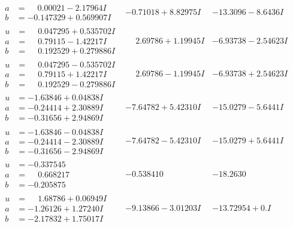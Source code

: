 \documentclass[1p]{elsarticle_modified}
\theoremstyle{definition}
\begin{document}
$$\begin{array}{c|c|c}
\begin{aligned}
a &= \phantom{-}0.00021 - 2.17964 I \\
b &= -0.147329 + 0.569907 I\end{aligned}
 & -0.71018 + 8.82975 I & -13.3096 - 8.6436 I \\ \hline\begin{aligned}
u &= \phantom{-}0.047295 + 0.535702 I \\
a &= \phantom{-}0.79115 - 1.42217 I \\
b &= \phantom{-}0.192529 + 0.279886 I\end{aligned}
 & \phantom{-}2.69786 + 1.19945 I & -6.93738 - 2.54623 I \\ \hline\begin{aligned}
u &= \phantom{-}0.047295 - 0.535702 I \\
a &= \phantom{-}0.79115 + 1.42217 I \\
b &= \phantom{-}0.192529 - 0.279886 I\end{aligned}
 & \phantom{-}2.69786 - 1.19945 I & -6.93738 + 2.54623 I \\ \hline\begin{aligned}
u &= -1.63846 + 0.04838 I \\
a &= -0.24414 + 2.30889 I \\
b &= -0.31656 + 2.94869 I\end{aligned}
 & -7.64782 + 5.42310 I & -15.0279 - 5.6441 I \\ \hline\begin{aligned}
u &= -1.63846 - 0.04838 I \\
a &= -0.24414 - 2.30889 I \\
b &= -0.31656 - 2.94869 I\end{aligned}
 & -7.64782 - 5.42310 I & -15.0279 + 5.6441 I \\ \hline\begin{aligned}
u &= -0.337545\phantom{ +0.000000I} \\
a &= \phantom{-}0.668217\phantom{ +0.000000I} \\
b &= -0.205875\phantom{ +0.000000I}\end{aligned}
 & -0.538410\phantom{ +0.000000I} & -18.2630\phantom{ +0.000000I} \\ \hline\begin{aligned}
u &= \phantom{-}1.68786 + 0.06949 I \\
a &= -1.26126 + 1.27240 I \\
b &= -2.17832 + 1.75017 I\end{aligned}
 & -9.13866 - 3.01203 I & -13.72954 + 0. I\phantom{ +0.000000I} \\ \hline\begin{aligned}

\end{aligned}
\end{array}$$
\end{document}
